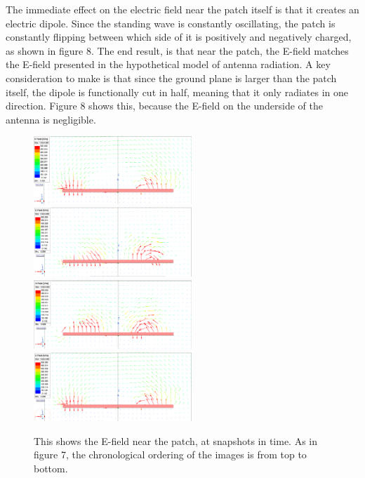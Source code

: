 \documentclass[12pt]{article}
\begin{document}
The immediate effect on the electric field near the patch itself is that it creates an electric dipole. Since the standing wave is constantly oscillating, the patch is constantly flipping between which side of it is positively and negatively charged, as shown in figure 8. The end result, is that near the patch, the E-field matches the E-field presented in the hypothetical model of antenna radiation. A key consideration to make is that since the ground plane is larger than the patch itself, the dipole is functionally cut in half, meaning that it only radiates in one direction. Figure 8 shows this, because the E-field on the underside of the antenna is negligible.

\begin{figure}[ht]
    \centering
    \includegraphics[width=0.53\textwidth]{patch-antenna-NearEfield-t0.png}
    \includegraphics[width=0.53\textwidth]{patch-antenna-NearEfield-t1.png}
    \includegraphics[width=0.53\textwidth]{patch-antenna-NearEfield-t2.png}
    \includegraphics[width=0.53\textwidth]{patch-antenna-NearEfield-t3.png}
    \caption{This shows the E-field near the patch, at snapshots in time. As in figure 7, the chronological ordering of the images is from top to bottom.}
\end{figure}  
\end{document}
